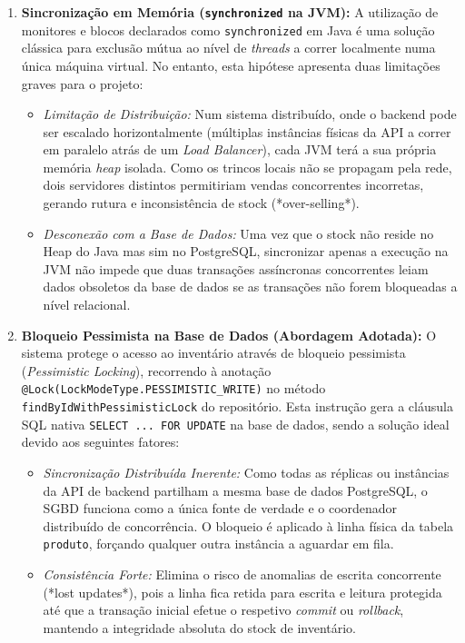 \documentclass[11pt,a4paper,oneside]{report}
\begin{document}
\begin{enumerate}
    \item \textbf{Sincronização em Memória (\texttt{synchronized} na JVM):} A utilização de monitores e blocos declarados como \texttt{synchronized} em Java é uma solução clássica para exclusão mútua ao nível de \textit{threads} a correr localmente numa única máquina virtual. No entanto, esta hipótese apresenta duas limitações graves para o projeto:
    \begin{itemize}
        \item \textit{Limitação de Distribuição:} Num sistema distribuído, onde o backend pode ser escalado horizontalmente (múltiplas instâncias físicas da API a correr em paralelo atrás de um \textit{Load Balancer}), cada JVM terá a sua própria memória \textit{heap} isolada. Como os trincos locais não se propagam pela rede, dois servidores distintos permitiriam vendas concorrentes incorretas, gerando rutura e inconsistência de stock (*over-selling*).
        \item \textit{Desconexão com a Base de Dados:} Uma vez que o stock não reside no Heap do Java mas sim no PostgreSQL, sincronizar apenas a execução na JVM não impede que duas transações assíncronas concorrentes leiam dados obsoletos da base de dados se as transações não forem bloqueadas a nível relacional.
    \end{itemize}

    \item \textbf{Bloqueio Pessimista na Base de Dados (Abordagem Adotada):} O sistema protege o acesso ao inventário através de bloqueio pessimista (\textit{Pessimistic Locking}), recorrendo à anotação \texttt{@Lock(LockModeType.PESSIMISTIC\_WRITE)} no método \texttt{findByIdWithPessimisticLock} do repositório. Esta instrução gera a cláusula SQL nativa \texttt{SELECT ... FOR UPDATE} na base de dados, sendo a solução ideal devido aos seguintes fatores:
    \begin{itemize}
        \item \textit{Sincronização Distribuída Inerente:} Como todas as réplicas ou instâncias da API de backend partilham a mesma base de dados PostgreSQL, o SGBD funciona como a única fonte de verdade e o coordenador distribuído de concorrência. O bloqueio é aplicado à linha física da tabela \texttt{produto}, forçando qualquer outra instância a aguardar em fila.
        \item \textit{Consistência Forte:} Elimina o risco de anomalias de escrita concorrente (*lost updates*), pois a linha fica retida para escrita e leitura protegida até que a transação inicial efetue o respetivo \textit{commit} ou \textit{rollback}, mantendo a integridade absoluta do stock de inventário.
    \end{itemize}
\end{enumerate}
\end{document}
